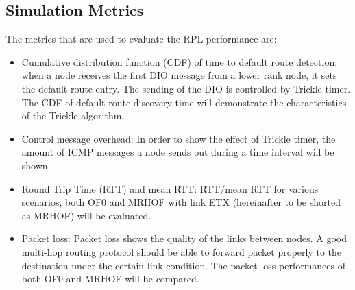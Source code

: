 \subsection{Simulation Metrics}
\label{Sim:metrics}
The metrics that are used to evaluate the RPL performance are:
\begin{itemize}
\item Cumulative distribution function (CDF) of time to default route detection: when a node receives the first DIO message from a lower rank node, it sets the default route entry. The sending of the DIO is controlled by Trickle timer. The CDF of default route discovery time will demonstrate the characteristics of the Trickle algorithm.
\newline

\item Control message overhead: In order to show the effect of Trickle timer, the amount of ICMP messages a node sends out during a time interval will be shown.
\newline

\item Round Trip Time (RTT) and mean RTT: RTT/mean RTT for various scenarios, both OF0 and MRHOF with link ETX (hereinafter to be shorted as MRHOF) will be evaluated.
\newline

\item Packet loss: Packet loss shows the quality of the links between nodes. A good multi-hop routing protocol should be able to forward packet properly to the destination under the certain link condition. The packet loss performances of both OF0 and MRHOF will be compared.
\end{itemize}
\newline







